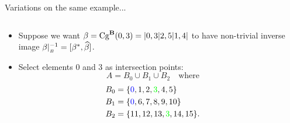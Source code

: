 \begin{frame}[fragile,label=OAEx2,shrink=5]{Variations on the same example... }

  \begin{columns}
    \begin{column}{0.7\textwidth}
      \begin{itemize}
      \item 
        Suppose we want $\beta = \mathrm{Cg}^{\mathbf{B}}(0,3) =| 0, 3 | 2, 5 | 1, 4 |$ to 
        \vskip4pt
        have non-trivial inverse image $\beta|_{_B}^{-1} = [\beta^*, \widehat{\beta}]$.  
        \vskip6pt
      \item<2-> Select elements 0 and 3 as intersection points:
        \[
        A = B_0 \cup B_1 \cup B_2 \quad \text{where}
        \]
        \begin{align*}
          B_0 &= \{{\color{blue} 0}, 1,  2,  {\color{green}3},  4,  5\}\\
          B_1 &= \{{\color{blue} 0}, 6,  7,  8,  9, 10\}\\
          B_2 &= \{11, 12, 13, {\color{green}3}, 14, 15\}.
        \end{align*}
      \end{itemize}
    \end{column}
    \begin{column}{0.3\textwidth}

    \end{column}

  \end{columns}

  \vskip-5mm

  \begin{columns}
    \begin{column}{0.3\textwidth}

\end{column}
\end{columns}
\end{frame}
